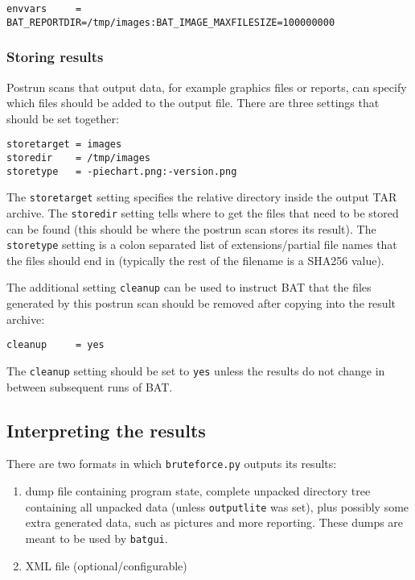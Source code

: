 \documentclass[10pt]{article}
\begin{document}
\begin{verbatim}
envvars     = BAT_REPORTDIR=/tmp/images:BAT_IMAGE_MAXFILESIZE=100000000
\end{verbatim}

\subsubsection{Storing results}

Postrun scans that output data, for example graphics files or reports, can
specify which files should be added to the output file. There are three
settings that should be set together:

\begin{verbatim}
storetarget = images
storedir    = /tmp/images
storetype   = -piechart.png:-version.png
\end{verbatim}

The \texttt{storetarget} setting specifies the relative directory inside the
output TAR archive. The \texttt{storedir} setting tells where to get the files
that need to be stored can be found (this should be where the postrun scan
stores its result). The \texttt{storetype} setting is a colon separated list of
extensions/partial file names that the files should end in (typically the rest
of the filename is a SHA256 value).

The additional setting \texttt{cleanup} can be used to instruct BAT that the
files generated by this postrun scan should be removed after copying into the
result archive:

\begin{verbatim}
cleanup     = yes
\end{verbatim}

The \texttt{cleanup} setting should be set to \texttt{yes} unless the results
do not change in between subsequent runs of BAT.

\subsection{Interpreting the results}

There are two formats in which \texttt{bruteforce.py} outputs its results:

\begin{enumerate}
\item dump file containing program state, complete unpacked directory tree
containing all unpacked data (unless \texttt{outputlite} was set), plus
possibly some extra generated data, such as pictures and more reporting. These
dumps are meant to be used by \texttt{batgui}.
\item XML file (optional/configurable)
\end{enumerate}
\end{document}
